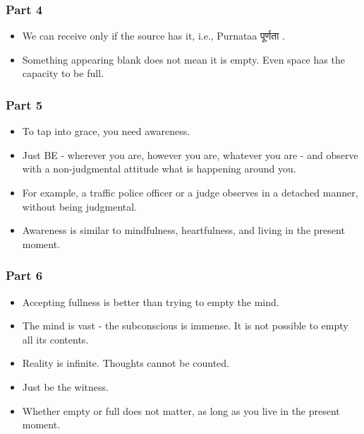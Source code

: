 \begin{frame}[fragile]\frametitle{Part 4}

\begin{itemize}
    \item We can receive only if the source has it, i.e., Purnataa पूर्णता .
    \item Something appearing blank does not mean it is empty. Even space has the capacity to be full.
\end{itemize}

\end{frame}

\begin{frame}[fragile]\frametitle{Part 5}

\begin{itemize}
    \item To tap into grace, you need awareness.
    \item Just BE - wherever you are, however you are, whatever you are - and observe with a non-judgmental attitude what is happening around you.
    \item For example, a traffic police officer or a judge observes in a detached manner, without being judgmental.
    \item Awareness is similar to mindfulness, heartfulness, and living in the present moment.
\end{itemize}

\end{frame}

\begin{frame}[fragile]\frametitle{Part 6}

\begin{itemize}
    \item Accepting fullness is better than trying to empty the mind.
    \item The mind is vast - the subconscious is immense. It is not possible to empty all its contents.
    \item Reality is infinite. Thoughts cannot be counted.
    \item Just be the witness.
    \item Whether empty or full does not matter, as long as you live in the present moment.
\end{itemize}

\end{frame}

